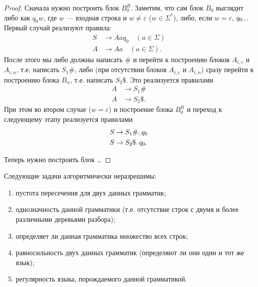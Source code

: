 \documentclass[12pt,a4paper]{article}
\newcommand{\spacesymbol}{\ensuremath{\text{\textvisiblespace}}}
\begin{document}
\begin{proof}
        Сначала нужно построить блок $B_0^R$. Заметим, что сам блок $B_0$ выглядит либо как $q_0 w$, где $w$ --- входная строка и $w \neq \varepsilon$ ($w \in \Sigma^*$), либо, если $w = \varepsilon$, $q_0 \spacesymbol$. Первый случай реализуют правила:
        \begin{align*}
            S &\to Aaq_0 \quad (a \in \Sigma)\\
            A &\to Aa \quad (a \in \Sigma).
        \end{align*}
        После этого мы либо должны написать $\#$ и перейти к построению блоков $A_{i, c}$ и $A_{i, n}$, т.е. написать $S_1 \#$, либо (при отсутствии блоков $A_{i, c}$ и $A_{i, n}$) сразу перейти к построению блока $B_n$, т.е. написать $S_2 \$$. Это реализуется правилами
        \begin{align*}
            A &\to S_1 \#\\
            A &\to S_2 \$.
        \end{align*}
        При этом во втором случае ($w = \varepsilon$) и построение блока $B_0^R$ и переход к следующему этапу реализуется правилами
        \begin{align*}
            S &\to S_1 \# \spacesymbol q_0\\
            S &\to S_2 \$ \spacesymbol q_0.
        \end{align*}

        Теперь нужно построить блок \dots
    \end{proof}

    \begin{theorem}
        Следующие задачи алгоритмически неразрешимы:
        \begin{enumerate}
            \item пустота пересечения для двух данных грамматик;
            \item однозначность данной грамматики (т.е. отсутствие строк с двумя и более различными деревьями разбора);
            \item определяет ли данная грамматика множество всех строк;
            \item равносильность двух данных грамматик (определяют ли они один и тот же язык);
            \item регулярность языка, порождаемого данной грамматикой.
        \end{enumerate}
    \end{theorem}
\end{document}
